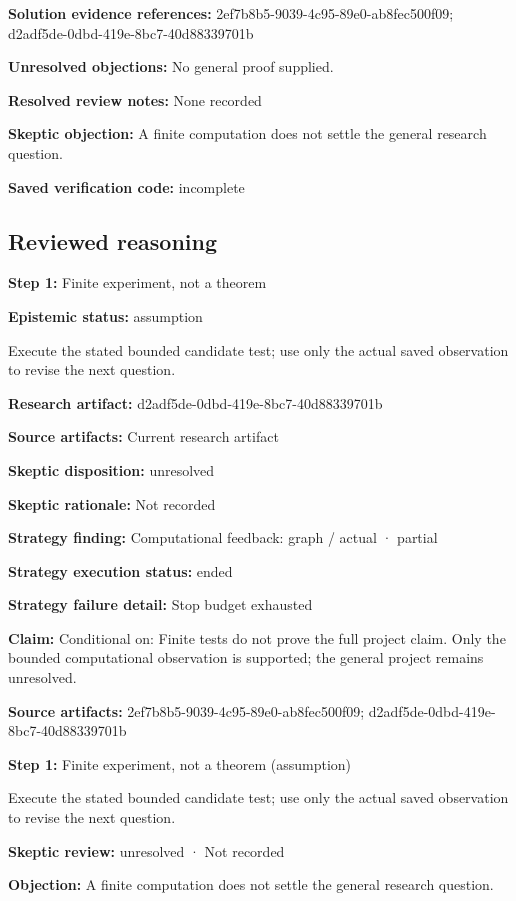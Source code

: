 \documentclass[11pt]{article}
\begin{document}
\textbf{Solution evidence references:} 2ef7b8b5-9039-4c95-89e0-ab8fec500f09; d2adf5de-0dbd-419e-8bc7-40d88339701b\par
\textbf{Unresolved objections:} No general proof supplied.\par
\textbf{Resolved review notes:} None recorded\par
\textbf{Skeptic objection:} A finite computation does not settle the general research question.\par
\textbf{Saved verification code:} incomplete\par
\subsection{Reviewed reasoning}
\textbf{Step 1:} Finite experiment, not a theorem\par
\textbf{Epistemic status:} assumption\par
Execute the stated bounded candidate test; use only the actual saved observation to revise the next question.\par
\textbf{Research artifact:} d2adf5de-0dbd-419e-8bc7-40d88339701b\par
\textbf{Source artifacts:} Current research artifact\par
\textbf{Skeptic disposition:} unresolved\par
\textbf{Skeptic rationale:} Not recorded\par
\textbf{Strategy finding:} Computational feedback: graph / actual · partial\par
\textbf{Strategy execution status:} ended\par
\textbf{Strategy failure detail:} Stop budget exhausted\par
\textbf{Claim:} Conditional on: Finite tests do not prove the full project claim. Only the bounded computational observation is supported; the general project remains unresolved.\par
\textbf{Source artifacts:} 2ef7b8b5-9039-4c95-89e0-ab8fec500f09; d2adf5de-0dbd-419e-8bc7-40d88339701b\par
\textbf{Step 1:} Finite experiment, not a theorem (assumption)\par
Execute the stated bounded candidate test; use only the actual saved observation to revise the next question.\par
\textbf{Skeptic review:} unresolved · Not recorded\par
\textbf{Objection:} A finite computation does not settle the general research question.\par
\end{document}
